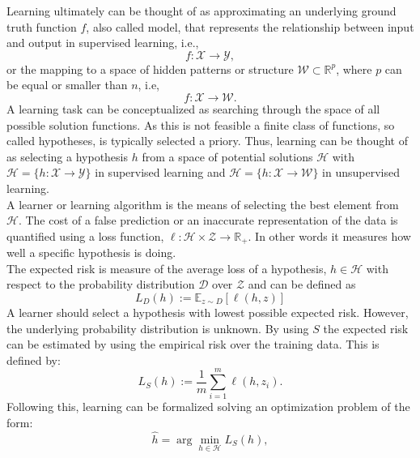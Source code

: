 \begin{tcolorbox}
    Learning ultimately can be thought of as approximating an underlying ground truth function $f$, also called model, that represents the relationship between input and output in supervised learning, i.e., 
    \begin{equation}
    f:\mathcal{X}\rightarrow\mathcal{Y},
    \end{equation}
    or the mapping to a space of hidden patterns or structure $\mathcal{W}\subset\mathbb{R}^p$, where $p$ can be equal or smaller than $n$, i.e,
    \begin{equation}
    f:\mathcal{X}\rightarrow\mathcal{W}.
    \end{equation}
    A learning task can be conceptualized as searching through the space of all possible solution functions. As this is not feasible a finite class of functions, so called hypotheses, is typically selected a priory. Thus, learning can be thought of as selecting a hypothesis $h$ from a space of potential solutions $\mathcal{H}$ with $\mathcal{H}=\{h:\mathcal{X}\rightarrow\mathcal{Y}\}$ in supervised learning and $\mathcal{H}=\{h:\mathcal{X}\rightarrow\mathcal{W}\}$ in unsupervised learning. \\
    A learner or learning algorithm is the means of selecting the best element from $\mathcal{H}$.
    The cost of a false prediction or an inaccurate representation of the data is quantified using a loss function, $\ell:\mathcal{H}\times\mathcal{Z}\rightarrow\mathbb{R}_+$. In other words it measures how well a specific hypothesis is doing.\\
    The expected risk is measure of the average loss of a hypothesis, $h\in\mathcal{H}$ with respect to the probability distribution $\mathcal{D}$ over $\mathcal{Z}$ and can be defined as
    \begin{equation}
    L_{D}(h):=\mathbb{E}_{z\sim D}[\ell(h,z)]
    \end{equation}
    A learner should select a hypothesis with lowest possible expected risk. However, the underlying probability distribution is unknown. By using $S$ the expected risk can be estimated by using the empirical risk over the training data. This is defined by:
    \begin{equation}
    L_{S}(h):=\frac{1}{m}\sum_{i=1}^m\ell(h,z_i).
    \end{equation}
    Following this, learning can be formalized solving an optimization problem of the form: 
    \begin{equation}
    \hat{h}=\arg\min_{h\in\mathcal{H}}L_{S}(h),
    \end{equation}

\end{tcolorbox}
